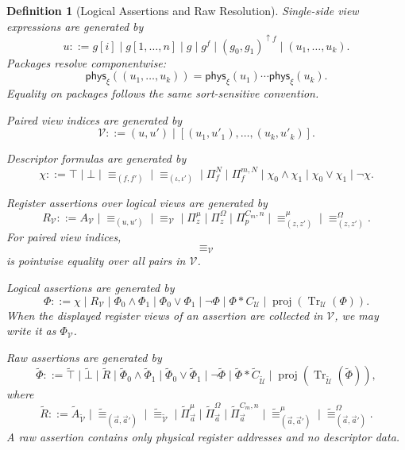 \documentclass[acmsmall,screen,review,anonymous,nonacm]{acmart}
\newtheorem{definition}{Definition}[section]
\theoremstyle{defn_style}
\begin{document}
\begin{definition}[Logical Assertions and Raw Resolution]
Single-side view expressions are generated by
\[
u ::=
g[i]
\mid
g[1,\ldots,n]
\mid
g
\mid
g^{f}
\mid
(g_0,g_1)^{\uparrow f}
\mid
(u_1,\ldots,u_k).
\]
Packages resolve componentwise:
\[
\mathsf{phys}_{\xi}((u_1,\ldots,u_k))
=
\mathsf{phys}_{\xi}(u_1)\cdots\mathsf{phys}_{\xi}(u_k).
\]
Equality on packages follows the same sort-sensitive convention.

Paired view indices are generated by
\[
\mathcal V ::=
(u,u')
\mid
[(u_1,u'_1),\ldots,(u_k,u'_k)].
\]

Descriptor formulas are generated by
\[
\chi ::=
\top
\mid
\bot
\mid
\equiv_{(f,f')}
\mid
\equiv_{(\iota,\iota')}
\mid
\Pi_f^N
\mid
\Pi_f^{m,N}
\mid
\chi_0\land\chi_1
\mid
\chi_0\lor\chi_1
\mid
\neg\chi .
\]

Register assertions over logical views are generated by
\[
R_{\mathcal V} ::=
A_{\mathcal V}
\mid
\equiv_{(u,u')}
\mid
\equiv_{\mathcal V}
\mid
\Pi_z^\mu
\mid
\Pi_z^\Omega
\mid
\Pi_p^{C_m,n}
\mid
\equiv_{(z,z')}^\mu
\mid
\equiv_{(z,z')}^\Omega .
\]
For paired view indices,
\[
\equiv_{\mathcal V}
\]
is pointwise equality over all pairs in \(\mathcal V\).

Logical assertions are generated by
\[
\Phi ::=
\chi
\mid
R_{\mathcal V}
\mid
\Phi_0\land\Phi_1
\mid
\Phi_0\lor\Phi_1
\mid
\neg\Phi
\mid
\Phi * C_{\mathcal U}
\mid
\operatorname{proj}\!\left(
\operatorname{Tr}_{\mathcal U}(\Phi)
\right).
\]
When the displayed register views of an assertion are collected in
\(\mathcal V\), we may write it as \(\Phi_{\mathcal V}\).

Raw assertions are generated by
\[
\widetilde{\Phi} ::=
\widetilde{\top}
\mid
\widetilde{\bot}
\mid
\widetilde R
\mid
\widetilde{\Phi}_0\land\widetilde{\Phi}_1
\mid
\widetilde{\Phi}_0\lor\widetilde{\Phi}_1
\mid
\neg\widetilde{\Phi}
\mid
\widetilde{\Phi} * \widetilde C_{\widetilde{\mathcal U}}
\mid
\operatorname{proj}\!\left(
\operatorname{Tr}_{\widetilde{\mathcal U}}(\widetilde{\Phi})
\right),
\]
where
\[
\widetilde R ::=
\widetilde A_{\widetilde{\mathcal V}}
\mid
\widetilde{\equiv}_{(\vec a,\vec a')}
\mid
\widetilde{\equiv}_{\widetilde{\mathcal V}}
\mid
\widetilde{\Pi}_{\vec a}^{\mu}
\mid
\widetilde{\Pi}_{\vec a}^{\Omega}
\mid
\widetilde{\Pi}_{\vec a}^{C_m,n}
\mid
\widetilde{\equiv}_{(\vec a,\vec a')}^{\mu}
\mid
\widetilde{\equiv}_{(\vec a,\vec a')}^{\Omega}.
\]
A raw assertion contains only physical register addresses and no descriptor
data.


\end{definition}
\end{document}
